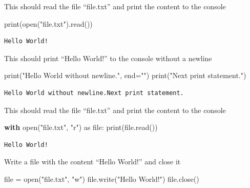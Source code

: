 \documentclass[
  letterpaper,
  DIV=11,
  numbers=noendperiod]{scrreprt}
\newenvironment{Shaded}{\begin{snugshade}}{\end{snugshade}}
\newcommand{\BuiltInTok}[1]{\textcolor[rgb]{0.00,0.23,0.31}{#1}}
\newcommand{\ControlFlowTok}[1]{\textcolor[rgb]{0.00,0.23,0.31}{\textbf{#1}}}
\newcommand{\ImportTok}[1]{\textcolor[rgb]{0.00,0.46,0.62}{#1}}
\newcommand{\NormalTok}[1]{\textcolor[rgb]{0.00,0.23,0.31}{#1}}
\newcommand{\OperatorTok}[1]{\textcolor[rgb]{0.37,0.37,0.37}{#1}}
\newcommand{\StringTok}[1]{\textcolor[rgb]{0.13,0.47,0.30}{#1}}
\begin{document}
This should read the file ``file.txt'' and print the content to the
console

\begin{Shaded}
\begin{Highlighting}[]
\BuiltInTok{print}\NormalTok{(}\BuiltInTok{open}\NormalTok{(}\StringTok{"file.txt"}\NormalTok{).read()) }
\end{Highlighting}
\end{Shaded}

\begin{verbatim}
Hello World!
\end{verbatim}

This should print ``Hello World!'' to the console without a newline

\begin{Shaded}
\begin{Highlighting}[]
\BuiltInTok{print}\NormalTok{(}\StringTok{"Hello World without newline."}\NormalTok{, end}\OperatorTok{=}\StringTok{""}\NormalTok{) }
\BuiltInTok{print}\NormalTok{(}\StringTok{"Next print statement."}\NormalTok{)}
\end{Highlighting}
\end{Shaded}

\begin{verbatim}
Hello World without newline.Next print statement.
\end{verbatim}

This should read the file ``file.txt'' and print the content to the
console

\begin{Shaded}
\begin{Highlighting}[]
\ControlFlowTok{with} \BuiltInTok{open}\NormalTok{(}\StringTok{"file.txt"}\NormalTok{, }\StringTok{"r"}\NormalTok{) }\ImportTok{as} \BuiltInTok{file}\NormalTok{: }\BuiltInTok{print}\NormalTok{(}\BuiltInTok{file}\NormalTok{.read()) }
\end{Highlighting}
\end{Shaded}

\begin{verbatim}
Hello World!
\end{verbatim}

Write a file with the content ``Hello World!'' and close it

\begin{Shaded}
\begin{Highlighting}[]
\BuiltInTok{file} \OperatorTok{=} \BuiltInTok{open}\NormalTok{(}\StringTok{"file.txt"}\NormalTok{, }\StringTok{"w"}\NormalTok{)}
\BuiltInTok{file}\NormalTok{.write(}\StringTok{"Hello World!"}\NormalTok{)}
\BuiltInTok{file}\NormalTok{.close()}
\end{Highlighting}
\end{Shaded}
\end{document}
